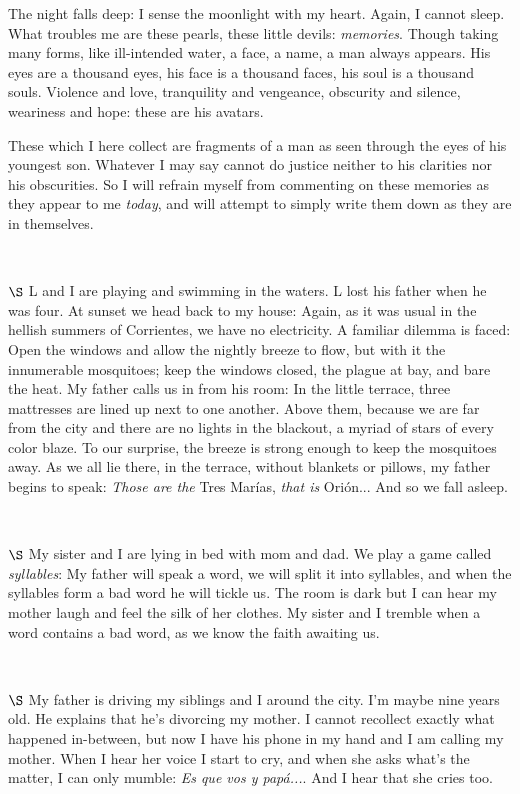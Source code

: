 \documentclass[a4paper, 12pt]{article}
\begin{document}
The night falls deep: I sense the moonlight with my heart. Again, I cannot
sleep. What troubles me are these pearls, these little devils:
\textit{memories}. Though taking many forms, like ill-intended water, a face, a
name, a man always appears. His eyes are a thousand eyes, his face is a
thousand faces, his soul is a thousand souls. Violence and love, tranquility
and vengeance, obscurity and silence, weariness and hope: these are his
avatars. 

These which I here collect are fragments of a man as seen through the eyes of
his youngest son. Whatever I may say cannot do justice neither to his clarities
nor his obscurities. So I will refrain myself from commenting on these memories
as they appear to me \textit{today}, and will attempt to simply write them down
as they are in themselves.

~ 

$\S$ L and I are playing and swimming in the waters. L lost his father when he
was four. At sunset we head back to my house: Again, as it was usual in the
hellish summers of Corrientes, we have no electricity. A familiar dilemma is
faced: Open the windows and allow the nightly breeze to flow, but with it the
innumerable mosquitoes; keep the windows closed, the plague at bay,
and bare the heat. My father calls us in from his room: In the little terrace,
three mattresses are lined up next to one another. Above them, because we are 
far from the city and there are no lights in the blackout, a myriad of stars of every
color blaze. To our surprise, the breeze is strong enough to keep the mosquitoes 
away. As we all lie there, in the terrace, without blankets or pillows,
my father begins to speak: \textit{Those are the} Tres Marías, \textit{that is } Orión...
And so we fall asleep.

~ 


$\S$ My sister and I are lying in bed with mom and dad. We play a game called
\textit{syllables}: My father will speak a word, we will split it into
syllables, and when the syllables form a bad word he will tickle us. The room
is dark but I can hear my mother laugh and feel the silk of her clothes. My
sister and I tremble when a word contains a bad word, as we know the faith
awaiting us.

~ 

$\S$ My father is driving my siblings and I around the city. I'm maybe nine
years old. He explains that he's divorcing my mother. I cannot recollect
exactly what happened in-between, but now I have his phone in my hand and I am
calling my mother. When I hear her voice I start to cry, and when she asks
what's the matter, I can only mumble: \textit{Es que vos y papá...}. And I hear
that she cries too.
\end{document}
